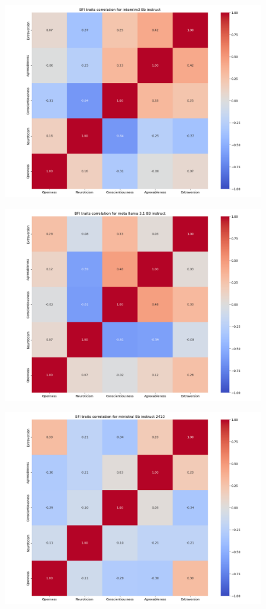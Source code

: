 \documentclass{article}
\begin{document}
\begin{figure}[H]
    \centering
    \includegraphics[width=0.7 \linewidth]{../Prompt_code/plots/internlm3-8b-instruct/bfi_correlation.png}
\end{figure}

\begin{figure}[H]
    \centering
    \includegraphics[width=0.7 \linewidth]{../Prompt_code/plots/meta-llama-3.1-8B-instruct/bfi_correlation.png}
\end{figure}

\begin{figure}[H]
    \centering
    \includegraphics[width=0.7 \linewidth]{../Prompt_code/plots/ministral-8b-instruct-2410/bfi_correlation.png}
\end{figure}
\end{document}
